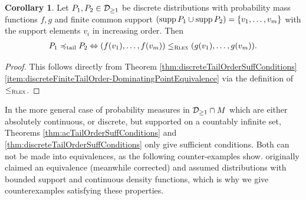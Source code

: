 \documentclass[a4paper]{scrreprt}
\newcommand{\M}{M}
\theoremstyle{definition}
\newtheorem{cor}[thm]{Corollary}
\begin{document}
    \begin{cor}
        Let $P_1, P_2 \in \mathcal{D}_{\geq1}$ be discrete distributions with probability mass functions $f, g$ and finite common support $(\operatorname{supp} P_1 \cup \operatorname{supp} P_2) = \{v_1, \dots, v_m\}$ with the support elements $v_i$ in increasing order. Then
        \begin{gather}            
            P_1 \preccurlyeq_{\text{tail}} P_2 \Leftrightarrow (f(v_1), \dots, f(v_m)) \leq_{\textsc{Rlex}} (g(v_1), \dots, g(v_m)).
            \label{eq:discreteFiniteTailOrder-RLexEquivalence}
        \end{gather}
        \label{cor:discreteFiniteTailOrder-RLexEquivalence}
    \end{cor}
    \vspace{-1.2cm}
    \begin{proof}
        This follows directly from Theorem \ref{thm:discreteTailOrderSuffConditions} \ref{item:discreteFiniteTailOrder-DominatingPointEquivalence} via the definition of $\leq_{\textsc{Rlex}}$.
    \end{proof}    
    In the more general case of probability measures in $\Dgeqone \cap \M$ which are either absolutely continuous, or discrete, but supported on a countably infinite set, Theorems \ref{thm:acTailOrderSuffConditions} and \ref{thm:discreteTailOrderSuffConditions} only give sufficient conditions.
    Both can not be made into equivalences, as the following counter-examples show. \cite{bib:rassGameRiskManagI} originally claimed an equivalence (meanwhile corrected) and assumed distributions with bounded support and continuous density functions, which is why we give counterexamples satisfying these properties.
\end{document}
